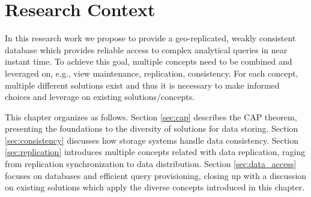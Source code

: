 
%

\chapter{Research Context}
\label{cha:research_context}


In this research work we propose to provide a geo-replicated, weakly consistent database which provides reliable access to complex analytical queries in near instant time.
To achieve this goal, multiple concepts need to be combined and leveraged on, e.g., view maintenance, replication, consistency.
For each concept, multiple different solutions exist and thus it is necessary to make informed choices and leverage on existing solutions/concepts.

This chapter organizes as follows.
Section \ref{sec:cap} describes the CAP theorem, presenting the foundations to the diversity of solutions for data storing.
Section \ref{sec:consistency} discusses how storage systems handle data consistency.
Section \ref{sec:replication} introduces multiple concepts related with data replication, raging from replication synchronization to data distribution. 
Section \ref{sec:data_access} focuses on databases and efficient query provisioning, closing up with a discussion on existing solutions which apply the diverse concepts introduced in this chapter.




